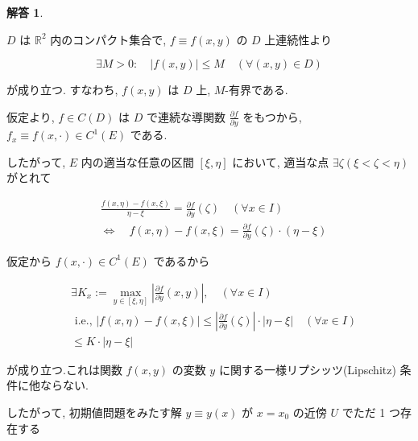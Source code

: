 \documentclass[10pt]{jsarticle}
\newtheorem*{answer*}{解答}
\begin{document}
\bigskip

\begin{answer*}
\end{answer*}

$D$ は $\mathbb{R}^{2}$ 内のコンパクト集合で, $f \equiv f(x, y)$ の $D$ 上連続性より

$$
\exists M>0: \quad|f(x, y)| \leqslant M \quad(\forall(x, y) \in D)
$$

が成り立つ. すなわち, $f(x, y)$ は $D$ 上, $M$-有界である.

仮定より, $f \in C(D)$ は $D$ で連続な導関数 $\frac{\partial f}{\partial y}$ をもつから, $f_{x} \equiv f(x, \cdot) \in C^{1}(E)$ である.

したがって, $E$ 内の適当な任意の区間 $[\xi, \eta]$ において, 適当な点 $\exists \zeta(\xi<\zeta<\eta)$ がとれて

$$
\begin{aligned}
& \frac{f(x, \eta)-f(x, \xi)}{\eta-\xi}=\frac{\partial f}{\partial y}(\zeta) \quad(\forall x \in I) \\
& \Longleftrightarrow \quad f(x, \eta)-f(x, \xi)=\frac{\partial f}{\partial y}(\zeta) \cdot(\eta-\xi)
\end{aligned}
$$

仮定から $f(x, \cdot) \in C^{1}(E)$ であるから

$$
\begin{aligned}
& \exists K_{x}:=\max _{y \in[\xi, \eta]}\left|\frac{\partial f}{\partial y}(x, y)\right|, \quad(\forall x \in I) \\
& \text { i.e., }|f(x, \eta)-f(x, \xi)| \leqslant\left|\frac{\partial f}{\partial y}(\zeta)\right| \cdot|\eta-\xi| \quad(\forall x \in I) \\
& \leqslant K \cdot|\eta-\xi|
\end{aligned}
$$

が成り立つ.これは関数 $f(x, y)$ の変数 $y$ に関する一様リプシッツ(Lipschitz) 条件に他ならない.

したがって, 初期値問題をみたす解 $y \equiv y(x)$ が $x=x_{0}$ の近傍 $U$ でただ 1 つ存在する
\end{document}
